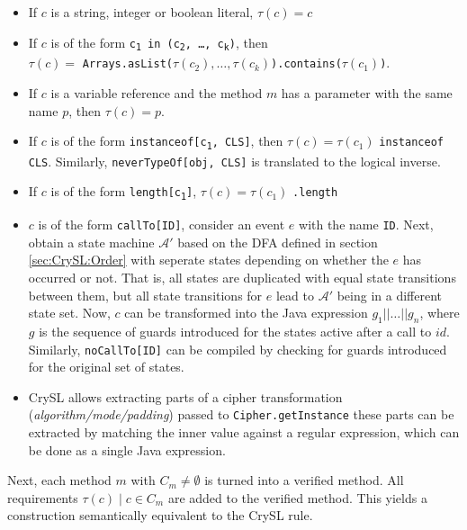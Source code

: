 \documentclass{article}
\begin{document}
\begin{itemize}
  \item If $c$ is a string, integer or boolean literal, $\tau(c) = c$
  \item If $c$ is of the form \texttt{c\textsubscript{1} in (c\textsubscript{2}, \dots, c\textsubscript{k})},
        then \\
        $\tau(c) = $ \texttt{Arrays.asList($\tau(c_2), \ldots, \tau(c_k)$).contains($\tau(c_1)$)}.  
  \item If $c$ is a variable reference and the method $m$ has a parameter with the same name $p$, then $\tau(c) = p$.
  \item If $c$ is of the form \texttt{instanceof[c\textsubscript{1}, CLS]}, then $\tau(c) = \tau(c_1)$ \texttt{instanceof CLS}.
        Similarly, \linebreak \texttt{neverTypeOf[obj, CLS]} is translated to the logical inverse.
  \item If $c$ is of the form \texttt{length[c\textsubscript{1}]}, $\tau(c) = \tau(c_1)$ \texttt{.length}
  \item $c$ is of the form \texttt{callTo[ID]}, consider an event $e$ with the name \texttt{ID}.
        Next, obtain a state machine $\mathcal{A}'$ based on the DFA defined in section \ref{sec:CrySL:Order} with
        seperate states depending on whether the $e$ has occurred or not.
        That is, all states are duplicated with equal state transitions between them, but all state transitions for $e$
        lead to $\mathcal{A}'$ being in a different state set.
        Now, $c$ can be transformed into the Java expression $g_1 || \ldots || g_n$, where $g$ is the sequence of guards
        introduced for the states active after a call to $id$.
        Similarly, \texttt{noCallTo[ID]} can be compiled by checking for guards introduced for the original set of states.
  \item CrySL allows extracting parts of a cipher transformation (\textit{algorithm/mode/padding}) passed to \linebreak \texttt{Cipher.getInstance}
        these parts can be extracted by matching the inner value against a regular expression, which can be done as a single
        Java expression.
  
\end{itemize}

Next, each method $m$ with $C_m \neq \emptyset$ is turned into a verified method.
All requirements $\tau(c) \mid c \in C_m$ are added to the verified method.
This yields a construction semantically equivalent to the CrySL rule.
\end{document}
